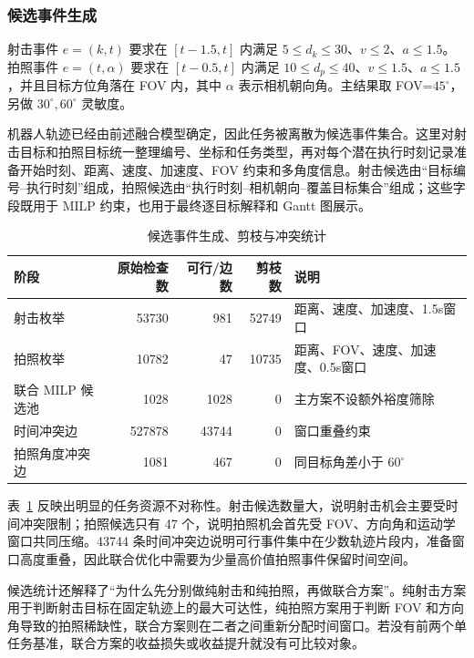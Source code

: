 \documentclass{cumcmthesis}
\begin{document}
\subsubsection{候选事件生成}
射击事件 $e=(k,t)$ 要求在 $[t-1.5,t]$ 内满足 $5\le d_k\le30$、$v\le2$、$a\le1.5$。拍照事件 $e=(t,\alpha)$ 要求在 $[t-0.5,t]$ 内满足 $10\le d_p\le40$、$v\le1.5$、$a\le1.5$，并且目标方位角落在 FOV 内，其中 $\alpha$ 表示相机朝向角。主结果取 FOV=$45^\circ$，另做 $30^\circ,60^\circ$ 灵敏度。

机器人轨迹已经由前述融合模型确定，因此任务被离散为候选事件集合。这里对射击目标和拍照目标统一整理编号、坐标和任务类型，再对每个潜在执行时刻记录准备开始时刻、距离、速度、加速度、FOV 约束和多角度信息。射击候选由“目标编号--执行时刻”组成，拍照候选由“执行时刻--相机朝向--覆盖目标集合”组成；这些字段既用于 MILP 约束，也用于最终逐目标解释和 Gantt 图展示。

\begin{table}[H]
  \centering
  \caption{候选事件生成、剪枝与冲突统计}
  \label{tab:candidate_stats}
  \footnotesize
  \setlength{\tabcolsep}{3pt}
  \begin{tabular}{@{}p{}rrrp{}@{}}
    \toprule
    阶段 & 原始检查数 & 可行/边数 & 剪枝数 & 说明\\
    \midrule
    射击枚举 & 53730 & 981 & 52749 & 距离、速度、加速度、1.5s窗口\\
    拍照枚举 & 10782 & 47 & 10735 & 距离、FOV、速度、加速度、0.5s窗口\\
    联合 MILP 候选池 & 1028 & 1028 & 0 & 主方案不设额外裕度筛除\\
    时间冲突边 & 527878 & 43744 & 0 & 窗口重叠约束\\
    拍照角度冲突边 & 1081 & 467 & 0 & 同目标角差小于 $60^\circ$\\
    \bottomrule
  \end{tabular}
\end{table}
表~\ref{tab:candidate_stats} 反映出明显的任务资源不对称性。射击候选数量大，说明射击机会主要受时间冲突限制；拍照候选只有 47 个，说明拍照机会首先受 FOV、方向角和运动学窗口共同压缩。43744 条时间冲突边说明可行事件集中在少数轨迹片段内，准备窗口高度重叠，因此联合优化中需要为少量高价值拍照事件保留时间空间。

候选统计还解释了“为什么先分别做纯射击和纯拍照，再做联合方案”。纯射击方案用于判断射击目标在固定轨迹上的最大可达性，纯拍照方案用于判断 FOV 和方向角导致的拍照稀缺性，联合方案则在二者之间重新分配时间窗口。若没有前两个单任务基准，联合方案的收益损失或收益提升就没有可比较对象。
\end{document}
